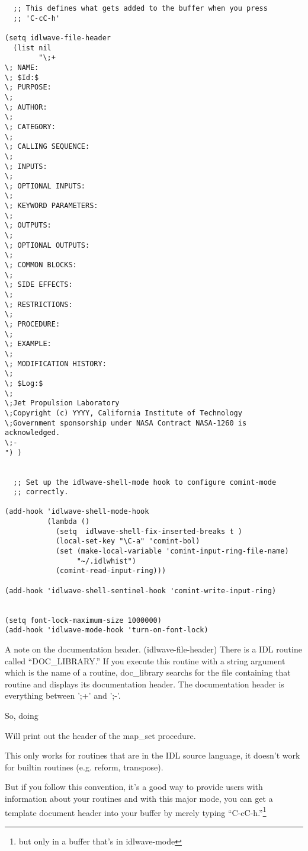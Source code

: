 \begin{verbatim}
  ;; This defines what gets added to the buffer when you press
  ;; 'C-cC-h'

(setq idlwave-file-header
  (list nil 
        "\;+
\; NAME:  
\; $Id:$
\; PURPOSE:  
\;
\; AUTHOR:  
\;
\; CATEGORY:  
\;
\; CALLING SEQUENCE:  
\; 
\; INPUTS:  
\;
\; OPTIONAL INPUTS:  
\;      
\; KEYWORD PARAMETERS:  
\;
\; OUTPUTS:  
\;
\; OPTIONAL OUTPUTS:  
\;
\; COMMON BLOCKS:  
\;
\; SIDE EFFECTS:  
\;
\; RESTRICTIONS:  
\;
\; PROCEDURE:  
\;
\; EXAMPLE:  
\;
\; MODIFICATION HISTORY:
\;
\; $Log:$
\;
\;Jet Propulsion Laboratory
\;Copyright (c) YYYY, California Institute of Technology
\;Government sponsorship under NASA Contract NASA-1260 is acknowledged.
\;-
") )


  ;; Set up the idlwave-shell-mode hook to configure comint-mode
  ;; correctly.

(add-hook 'idlwave-shell-mode-hook
          (lambda ()
            (setq  idlwave-shell-fix-inserted-breaks t )
            (local-set-key "\C-a" 'comint-bol)
            (set (make-local-variable 'comint-input-ring-file-name)
                 "~/.idlwhist")
            (comint-read-input-ring)))

(add-hook 'idlwave-shell-sentinel-hook 'comint-write-input-ring)


(setq font-lock-maximum-size 1000000)
(add-hook 'idlwave-mode-hook 'turn-on-font-lock)

\end{verbatim}


  A note on the documentation header. (idlwave-file-header) There is a
  IDL routine called ``DOC\_LIBRARY.'' If you execute this routine
  with a string argument which is the name of a routine, doc\_library
  searchs for the file containing that routine and displays its
  documentation header. The documentation header is everything between
  ';+' and ';-'.

  So, doing \\


  Will print out the header of the map\_set procedure. 

  This only works for routines that are in the IDL source language, it
  doesn't work for builtin routines (e.g. reform, transpose).

  But if you follow this convention, it's a good way to provide users
  with information about your routines and with this
   major mode, you can get a template document
  header into your buffer by merely typing ``C-cC-h.''\footnote{but
  only in a buffer that's in idlwave-mode}


